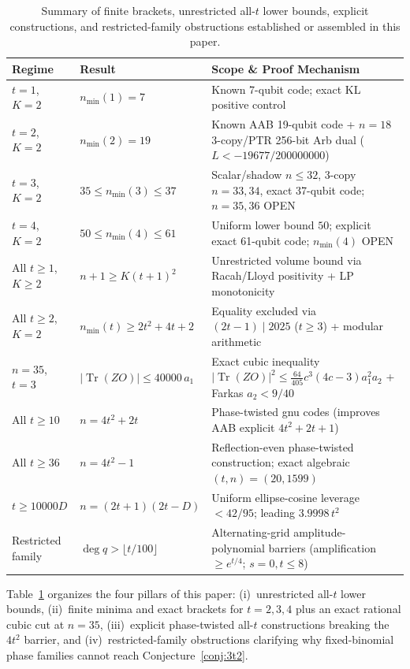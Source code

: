 \documentclass[11pt,letterpaper]{article}
\theoremstyle{definition}
\theoremstyle{remark}
\newcommand{\Tr}{\operatorname{Tr}}
\begin{document}
\begin{table}[!htbp]
\centering
\caption{Summary of finite brackets, unrestricted all-$t$ lower bounds, explicit constructions, and restricted-family obstructions established or assembled in this paper.}
\label{tab:quantum-summary}
\small
\begin{tabularx}{\linewidth}{@{}l l X@{}}
\toprule
\textbf{Regime} & \textbf{Result} & \textbf{Scope \& Proof Mechanism} \\
\midrule
$t=1$, $K=2$ & $n_{\min}(1)=7$ & Known 7-qubit code; exact KL positive control \\
$t=2$, $K=2$ & $n_{\min}(2)=19$ & Known AAB 19-qubit code + $n=18$ 3-copy/PTR 256-bit Arb dual ($L < -19677/200000000$) \\
$t=3$, $K=2$ & $35 \le n_{\min}(3) \le 37$ & Scalar/shadow $n\le 32$, 3-copy $n=33,34$, exact 37-qubit code; $n=35,36$ OPEN \\
$t=4$, $K=2$ & $50 \le n_{\min}(4) \le 61$ & Uniform lower bound $50$; explicit exact 61-qubit code; $n_{\min}(4)$ OPEN \\
All $t \ge 1$, $K \ge 2$ & $n+1 \ge K(t+1)^2$ & Unrestricted volume bound via Racah/Lloyd positivity + LP monotonicity \\
All $t \ge 2$, $K=2$ & $n_{\min}(t) \ge 2t^2+4t+2$ & Equality excluded via $(2t-1)\mid 2025$ ($t\ge 3$) + modular arithmetic \\
$n=35$, $t=3$ & $|\Tr(ZO)| \le 40000\,a_1$ & Exact cubic inequality $|\Tr(ZO)|^2 \le \frac{64}{405}c^3(4c-3)a_1^2 a_2$ + Farkas $a_2 < 9/40$ \\
All $t \ge 10$ & $n = 4t^2+2t$ & Phase-twisted gnu codes (improves AAB explicit $4t^2+2t+1$) \\
All $t \ge 36$ & $n = 4t^2-1$ & Reflection-even phase-twisted construction; exact algebraic $(t,n)=(20,1599)$ \\
$t \ge 10000D$ & $n = (2t+1)(2t-D)$ & Uniform ellipse-cosine leverage $<42/95$; leading $3.9998\,t^2$ \\
Restricted family & $\deg q > \lfloor t/100\rfloor$ & Alternating-grid amplitude-polynomial barriers (amplification $\ge e^{t/4}$; $s=0, t\le 8$) \\
\bottomrule
\end{tabularx}
\end{table}

Table~\ref{tab:quantum-summary} organizes the four pillars of this paper: (i)~unrestricted all-$t$ lower bounds, (ii)~finite minima and exact brackets for $t=2,3,4$ plus an exact rational cubic cut at $n=35$, (iii)~explicit phase-twisted all-$t$ constructions breaking the $4t^2$ barrier, and (iv)~restricted-family obstructions clarifying why fixed-binomial phase families cannot reach Conjecture~\ref{conj:3t2}.
\end{document}
